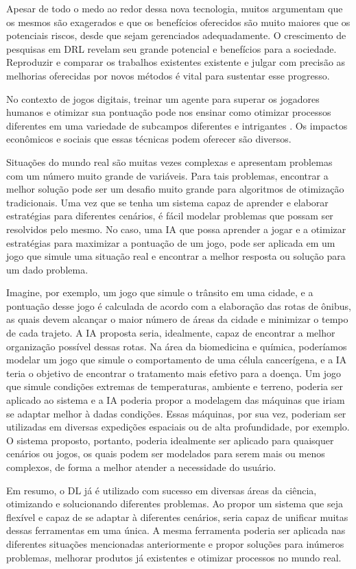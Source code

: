 Apesar de todo o medo ao redor dessa nova tecnologia, muitos argumentam que os mesmos são exagerados e que os benefícios oferecidos são muito maiores que os potenciais riscos, desde que sejam gerenciados adequadamente. O crescimento de pesquisas em DRL revelam seu grande potencial e benefícios para a sociedade. Reproduzir e comparar os trabalhos existentes existente e julgar com precisão as melhorias oferecidas por novos métodos é vital para sustentar esse progresso. 

\clearpage
No contexto de jogos digitais, treinar um agente para superar os jogadores humanos e otimizar sua pontuação pode nos ensinar como otimizar processos diferentes em uma variedade de subcampos diferentes e intrigantes \cite{comi:teach:AI:DRL:2018}. Os impactos econômicos e sociais que essas técnicas podem oferecer são diversos. 

Situações do mundo real são muitas vezes complexas e apresentam problemas com um número muito grande de variáveis. Para tais problemas, encontrar a melhor solução pode ser um desafio muito grande para algoritmos de otimização tradicionais. Uma vez que se tenha um sistema capaz de aprender e elaborar estratégias para diferentes cenários, é fácil modelar problemas que possam ser resolvidos pelo mesmo. No caso, uma IA que possa aprender a jogar e a otimizar estratégias para maximizar a pontuação de um jogo, pode ser aplicada em um jogo que simule uma situação real e encontrar a melhor resposta ou solução para um dado problema. 

Imagine, por exemplo, um jogo que simule o trânsito em uma cidade, e a pontuação desse jogo é calculada de acordo com a elaboração das rotas de ônibus, as quais devem alcançar o maior número de áreas da cidade e minimizar o tempo de cada trajeto. A IA proposta seria, idealmente, capaz de encontrar a melhor organização possível dessas rotas. Na área da biomedicina e química, poderíamos modelar um jogo que simule o comportamento de uma célula cancerígena, e a IA teria o objetivo de encontrar o tratamento mais efetivo para a doença. Um jogo que simule condições extremas de temperaturas, ambiente e terreno, poderia ser aplicado ao sistema e a IA poderia propor a modelagem das máquinas que iriam se adaptar melhor à dadas condições. Essas máquinas, por sua vez, poderiam ser utilizadas em diversas expedições espaciais ou de alta profundidade, por exemplo. O sistema proposto, portanto, poderia idealmente ser aplicado para quaisquer cenários ou jogos, os quais podem ser modelados para serem mais ou menos complexos, de forma a melhor atender a necessidade do usuário. 


Em resumo, o DL já é utilizado com sucesso em diversas áreas da ciência, otimizando e solucionando diferentes problemas. Ao propor um sistema que seja flexível e capaz de se adaptar à diferentes cenários, seria capaz de unificar muitas dessas ferramentas em uma única. A mesma ferramenta poderia ser aplicada nas diferentes situações mencionadas anteriormente e propor soluções para inúmeros problemas, melhorar produtos já existentes e otimizar processos no mundo real.



